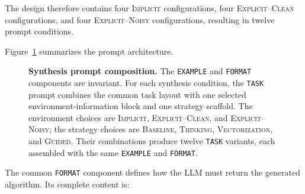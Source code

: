 The design therefore contains four \textsc{Implicit} configurations, four
\textsc{Explicit--Clean} configurations, and four
\textsc{Explicit--Noisy} configurations, resulting in twelve prompt
conditions.

Figure~\ref{fig:prompt_architecture} summarizes the prompt architecture.

\begin{figure}[htbp]
    \centering

    \resizebox{\textwidth}{!}{%
        
    }

    \caption[Synthesis prompt composition]{\textbf{Synthesis prompt composition.} The \texttt{EXAMPLE} and
    \texttt{FORMAT} components are invariant. For each synthesis condition,
    the \texttt{TASK} prompt combines the common task layout with one selected
    environment-information block and one strategy scaffold. The environment
    choices are \textsc{Implicit}, \textsc{Explicit--Clean}, and
    \textsc{Explicit--Noisy}; the strategy choices are \textsc{Baseline},
    \textsc{Thinking}, \textsc{Vectorization}, and \textsc{Guided}. Their
    combinations produce twelve \texttt{TASK} variants, each assembled with
    the same \texttt{EXAMPLE} and \texttt{FORMAT}.}

    \label{fig:prompt_architecture}
\end{figure}



The common \texttt{FORMAT} component defines how the LLM must return the
generated algorithm. Its complete content is:

